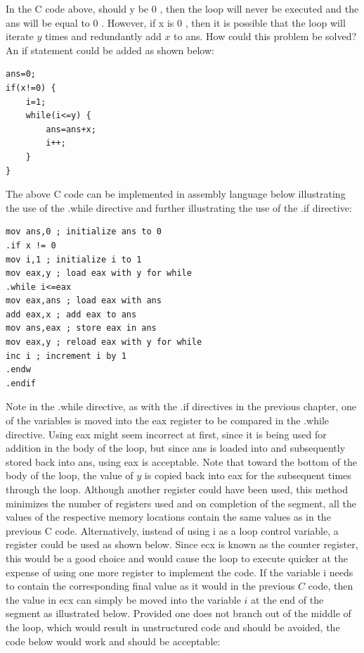 \documentclass[10pt]{book}
\begin{document}
In the C code above, should y be 0 , then the loop will never be executed and the ans will be equal to 0 . However, if x is 0 , then it is possible that the loop will iterate $y$ times and redundantly add $x$ to ans. How could this problem be solved? An if statement could be added as shown below:
\begin{verbatim}
ans=0;
if(x!=0) {
    i=1;
    while(i<=y) {
        ans=ans+x;
        i++;
    }
}
\end{verbatim}

The above C code can be implemented in assembly language below illustrating the use of the .while directive and further illustrating the use of the .if directive:

\begin{verbatim}
mov ans,0 ; initialize ans to 0
.if x != 0
mov i,1 ; initialize i to 1
mov eax,y ; load eax with y for while
.while i<=eax
mov eax,ans ; load eax with ans
add eax,x ; add eax to ans
mov ans,eax ; store eax in ans
mov eax,y ; reload eax with y for while
inc i ; increment i by 1
.endw
.endif
\end{verbatim}

Note in the .while directive, as with the .if directives in the previous chapter, one of the variables is moved into the eax register to be compared in the .while directive. Using eax might seem incorrect at first, since it is being used for addition in the body of the loop, but since ans is loaded into and subsequently stored back into ans, using eax is acceptable. Note that toward the bottom of the body of the loop, the value of $y$ is copied back into eax for the subsequent times through the loop. Although another register could have been used, this method minimizes the number of registers used and on completion of the segment, all the\\
values of the respective memory locations contain the same values as in the previous C code.
Alternatively, instead of using i as a loop control variable, a register could be used as shown below. Since ecx is known as the counter register, this would be a good choice and would cause the loop to execute quicker at the expense of using one more register to implement the code. If the variable i needs to contain the corresponding final value as it would in the previous $C$ code, then the value in ecx can simply be moved into the variable $i$ at the end of the segment as illustrated below. Provided one does not branch out of the middle of the loop, which would result in unstructured code and should be avoided, the code below would work and should be acceptable:
\end{document}
